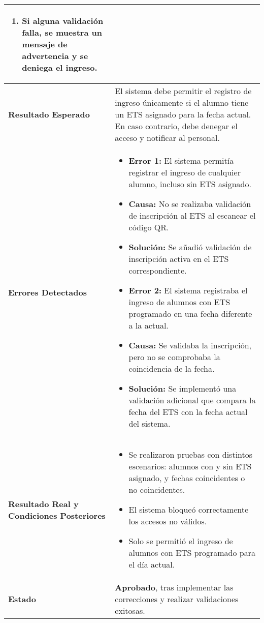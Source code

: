 \begin{longtable}{|p{5cm}|p{10cm}|}
\begin{enumerate}
		\item Si alguna validación falla, se muestra un mensaje de advertencia y se deniega el ingreso.
	\end{enumerate} \\
	\hline \textbf{Resultado Esperado} &
	El sistema debe permitir el registro de ingreso únicamente si el alumno tiene un ETS asignado para la fecha actual. En caso contrario, debe denegar el acceso y notificar al personal. \\
	\hline \textbf{Errores Detectados} &
	\begin{itemize}
		\item \textbf{Error 1:} El sistema permitía registrar el ingreso de cualquier alumno, incluso sin ETS asignado.
		\item \textbf{Causa:} No se realizaba validación de inscripción al ETS al escanear el código QR.
		\item \textbf{Solución:} Se añadió validación de inscripción activa en el ETS correspondiente.
		\item \textbf{Error 2:} El sistema registraba el ingreso de alumnos con ETS programado en una fecha diferente a la actual.
		\item \textbf{Causa:} Se validaba la inscripción, pero no se comprobaba la coincidencia de la fecha.
		\item \textbf{Solución:} Se implementó una validación adicional que compara la fecha del ETS con la fecha actual del sistema.
	\end{itemize} \\
	\hline \textbf{Resultado Real y Condiciones Posteriores} &
	\begin{itemize}
		\item Se realizaron pruebas con distintos escenarios: alumnos con y sin ETS asignado, y fechas coincidentes o no coincidentes.
		\item El sistema bloqueó correctamente los accesos no válidos.
		\item Solo se permitió el ingreso de alumnos con ETS programado para el día actual.
	\end{itemize} \\
	\hline \textbf{Estado} & \textbf{Aprobado}, tras implementar las correcciones y realizar validaciones exitosas. \\
	\hline
\end{longtable}